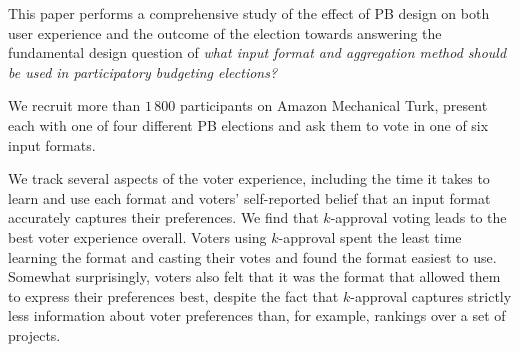 \documentclass[letterpaper]{article} %
\newcommand{\kibitz}[2]{\ifnum\Comments=1{\color{#1}{#2}}\fi}
\newcommand{\kg}[1]{\kibitz{red}{[Kobi says:#1]}}
\begin{document}
\kg{does this problem statement come too late?}
This paper performs   a comprehensive  study of the effect of PB design on both user experience and the outcome of the election   towards answering the fundamental design question of
\emph{what input format and aggregation method should be used  in participatory budgeting elections?
}







We recruit more than $1\,800$ participants on Amazon Mechanical Turk,  present each with one of four different PB elections  and ask them to vote in one of six   input formats. 

We track several aspects of the voter experience, including the time it takes to learn and use each format and voters' self-reported belief that an input format accurately captures their preferences.  
%
We find that $k$-approval voting leads to the best voter experience overall. Voters using $k$-approval spent the least time  learning the format and casting their votes and found the format easiest to use. Somewhat surprisingly, voters also felt that  it was the format that allowed them to express their preferences best, despite the fact that $k$-approval captures strictly less information about voter preferences than, for example,  rankings over a set of projects. 
\end{document}
